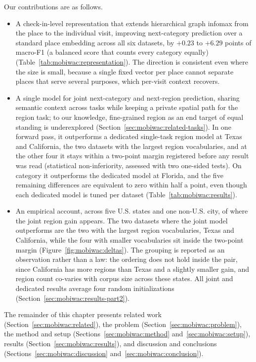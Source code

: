 Our contributions are as follows.
\begin{itemize}
  \item A check-in-level representation that extends hierarchical graph infomax from the place to the individual visit, improving next-category prediction over a standard place embedding across all six datasets, by $+0.23$ to $+6.29$ points of macro-F1 (a balanced score that counts every
    category equally) (Table~\ref{tab:mobiwac:representation}). The direction is
    consistent even where the size is small, because a single fixed vector
    per place cannot separate places that serve several purposes, which
    per-visit context recovers.
  \item A single model for joint next-category and next-region prediction, sharing semantic context across tasks while keeping a private spatial path for the region task; to our knowledge, fine-grained region as an end target of equal standing is underexplored (Section~\ref{sec:mobiwac:related-tasks}). In one forward pass, it outperforms a dedicated
    single-task region model at Texas and California, the two datasets with the
    largest region vocabularies, and at the other four it stays within a
    two-point margin registered before any result was read (statistical
    non-inferiority, assessed with two one-sided tests). On category it
    outperforms the dedicated model at Florida, and the five remaining
    differences are equivalent to zero within half a point, even though each
    dedicated model is tuned per dataset (Table~\ref{tab:mobiwac:results}).
  \item An empirical account, across five U.S. states and one non-U.S. city, of where the joint
    region gain appears. The two datasets where the joint model outperforms are the two with the
    largest region vocabularies, Texas and California, while the four with smaller vocabularies sit
    inside the two-point margin (Figure~\ref{fig:mobiwac:deltas}). The grouping is reported as an
    observation rather than a law: the ordering does not hold inside the pair, since California has
    more regions than Texas and a slightly smaller gain, and region count co-varies with corpus
    size across these states. All joint and dedicated results average
    four random initializations (Section~\ref{sec:mobiwac:results-part2}).
\end{itemize}

The remainder of this chapter presents related work (Section~\ref{sec:mobiwac:related}), the problem (Section~\ref{sec:mobiwac:problem}), the method and setup (Sections~\ref{sec:mobiwac:method} and~\ref{sec:mobiwac:setup}), results (Section~\ref{sec:mobiwac:results}), and discussion and conclusions (Sections~\ref{sec:mobiwac:discussion} and~\ref{sec:mobiwac:conclusion}).
